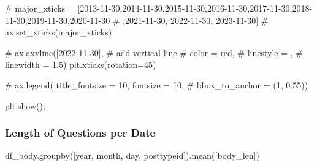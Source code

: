 \documentclass[
  letterpaper,
  DIV=11,
  numbers=noendperiod]{scrartcl}
\newenvironment{Shaded}{\begin{snugshade}}{\end{snugshade}}
\newcommand{\CommentTok}[1]{\textcolor[rgb]{0.37,0.37,0.37}{#1}}
\newcommand{\DecValTok}[1]{\textcolor[rgb]{0.68,0.00,0.00}{#1}}
\newcommand{\NormalTok}[1]{\textcolor[rgb]{0.00,0.23,0.31}{#1}}
\newcommand{\OperatorTok}[1]{\textcolor[rgb]{0.37,0.37,0.37}{#1}}
\newcommand{\StringTok}[1]{\textcolor[rgb]{0.13,0.47,0.30}{#1}}
\begin{document}
\begin{Shaded}
\begin{Highlighting}[]
\CommentTok{\# major\_xticks = [\textquotesingle{}2013{-}11{-}30\textquotesingle{},\textquotesingle{}2014{-}11{-}30\textquotesingle{},\textquotesingle{}2015{-}11{-}30\textquotesingle{},\textquotesingle{}2016{-}11{-}30\textquotesingle{},\textquotesingle{}2017{-}11{-}30\textquotesingle{},\textquotesingle{}2018{-}11{-}30\textquotesingle{},\textquotesingle{}2019{-}11{-}30\textquotesingle{},\textquotesingle{}2020{-}11{-}30\textquotesingle{}}
\CommentTok{\#                 ,\textquotesingle{}2021{-}11{-}30\textquotesingle{}, \textquotesingle{}2022{-}11{-}30\textquotesingle{}, \textquotesingle{}2023{-}11{-}30\textquotesingle{}]}
\CommentTok{\# ax.set\_xticks(major\_xticks)}

\CommentTok{\# ax.axvline([\textquotesingle{}2022{-}11{-}30\textquotesingle{}], \# add vertical line}
\CommentTok{\#            color = \textquotesingle{}red\textquotesingle{},}
\CommentTok{\#            linestyle = \textquotesingle{}{-}{-}\textquotesingle{},}
\CommentTok{\#            linewidth = 1.5)}
\NormalTok{plt.xticks(rotation}\OperatorTok{=}\DecValTok{45}\NormalTok{)}



\CommentTok{\# ax.legend( title\_fontsize = 10, fontsize = 10,}
\CommentTok{\#           bbox\_to\_anchor = (1, 0.55))}

\NormalTok{plt.show()}\OperatorTok{;}
\end{Highlighting}
\end{Shaded}

\subsubsection{Length of Questions per
Date}\label{length-of-questions-per-date}

\begin{Shaded}
\begin{Highlighting}[]
\NormalTok{df\_body.groupby([}\StringTok{\textquotesingle{}year\textquotesingle{}}\NormalTok{, }\StringTok{\textquotesingle{}month\textquotesingle{}}\NormalTok{, }\StringTok{\textquotesingle{}day\textquotesingle{}}\NormalTok{, }\StringTok{\textquotesingle{}posttypeid\textquotesingle{}}\NormalTok{]).mean([}\StringTok{\textquotesingle{}body\_len\textquotesingle{}}\NormalTok{])}
\end{Highlighting}
\end{Shaded}
\end{document}
